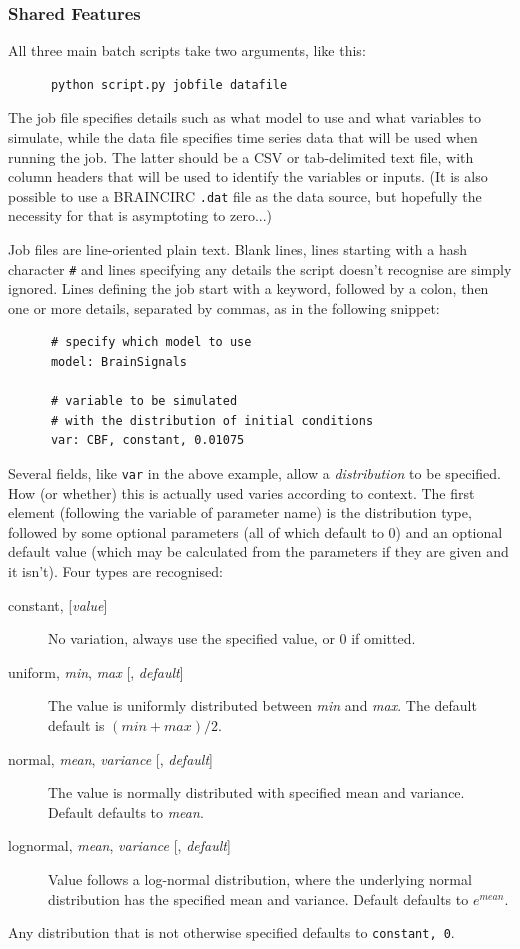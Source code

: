 \documentclass[a4paper,11pt]{article}
\begin{document}
\subsubsection{Shared Features}\label{batch:common}

All three main batch scripts take two arguments, like this:
\begin{verbatim}
      python script.py jobfile datafile
\end{verbatim}
The job file specifies details such as what model to use and what variables to simulate, while the data file specifies time series data that will be used when running the job. The latter should be a CSV or tab-delimited text file, with column headers that will be used to identify the variables or inputs. (It is also possible to use a BRAINCIRC \texttt{.dat} file as the data source, but hopefully the necessity for that is asymptoting to zero...)

Job files are line-oriented plain text. Blank lines, lines starting with a hash character \texttt{\#} and lines specifying any details the script doesn't recognise are simply ignored. Lines defining the job start with a keyword, followed by a colon, then one or more details, separated by commas, as in the following snippet:
\begin{verbatim}
      # specify which model to use
      model: BrainSignals
      
      # variable to be simulated
      # with the distribution of initial conditions
      var: CBF, constant, 0.01075
\end{verbatim}

Several fields, like \texttt{var} in the above example, allow a \textit{distribution} to be specified. How (or whether) this is actually used varies according to context. The first element (following the variable of parameter name) is the distribution type, followed by some optional parameters (all of which default to 0) and an optional default value (which may be calculated from the parameters if they are given and it isn't). Four types are recognised:
\begin{adjustwidth}{0.8cm}{0.8cm}
\begin{description}
\item[constant, {[\textit{value}]}] No variation, always use the specified value, or 0 if omitted.
\item[uniform, {\textit{min}, \textit{max} [, \textit{default}]}] The value is uniformly distributed between \textit{min} and \textit{max}. The default default is $(min + max)/2$.
\item[normal, {\textit{mean}, \textit{variance} [, \textit{default}]}] The value is normally distributed with specified mean and variance. Default defaults to \textit{mean}.
\item[lognormal, {\textit{mean}, \textit{variance} [, \textit{default}]}] Value follows a log-normal distribution, where the underlying normal distribution has the specified mean and variance. Default defaults to $e^{mean}$.
\end{description}
\end{adjustwidth}
Any distribution that is not otherwise specified defaults to \texttt{constant, 0}.
\end{document}
